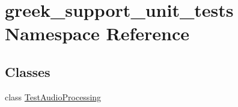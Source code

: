 \hypertarget{namespacegreek__support__unit__tests}{\section{greek\-\_\-support\-\_\-unit\-\_\-tests Namespace Reference}
\label{namespacegreek__support__unit__tests}
}
\subsection*{Classes}
\begin{DoxyCompactItemize}
\item 
class \hyperlink{classgreek__support__unit__tests_1_1TestAudioProcessing}{Test\-Audio\-Processing}
\end{DoxyCompactItemize}
